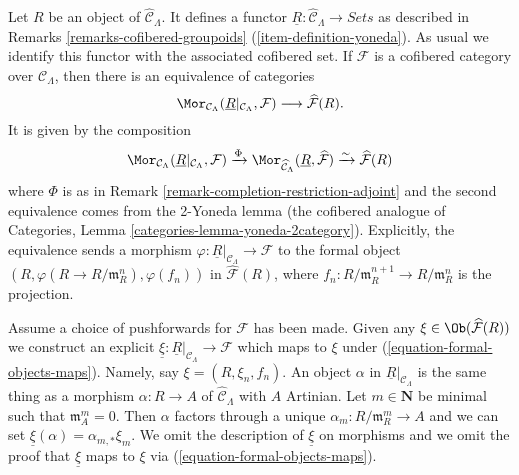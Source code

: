 \begin{remark}
\label{remark-formal-objects-yoneda}
Let $R$ be an object of $\widehat{\mathcal{C}}_\Lambda$.  It defines a functor
$\underline{R}: \widehat{\mathcal{C}}_\Lambda \to \textit{Sets}$
as described in
Remarks \ref{remarks-cofibered-groupoids} (\ref{item-definition-yoneda}).
As usual we identify this functor with the
associated cofibered set.  If $\mathcal{F}$ is a cofibered category over
$\mathcal{C}_\Lambda$, then there is an equivalence of categories
\begin{equation}
\label{equation-formal-objects-maps}
\Mor_{\mathcal{C}_\Lambda}(
\underline{R}|_{\mathcal{C}_\Lambda}, \mathcal{F})
\longrightarrow
\widehat{\mathcal{F}}(R).
\end{equation}
It is given by the composition
$$
\Mor_{\mathcal{C}_\Lambda}(
\underline{R}|_{\mathcal{C}_\Lambda}, \mathcal{F})
\xrightarrow{\Phi}
\Mor_{\widehat{\mathcal{C}}_\Lambda}(
\underline{R}, \widehat{\mathcal{F}})
\xrightarrow{\sim}
\widehat{\mathcal{F}}(R)
$$
where $\Phi$ is as in
Remark \ref{remark-completion-restriction-adjoint}
and the second equivalence comes from the 2-Yoneda lemma
(the cofibered analogue of
Categories, Lemma \ref{categories-lemma-yoneda-2category}).
Explicitly, the equivalence sends a morphism
$\varphi : \underline{R}|_{\mathcal{C}_\Lambda} \to \mathcal{F}$
to the formal object
$(R, \varphi(R \to R/\mathfrak{m}_R^n), \varphi(f_n))$ in
$\widehat{\mathcal{F}}(R)$, where
$f_n : R/\mathfrak m_R^{n + 1} \to R/\mathfrak m_R^n$ is the projection.

\medskip\noindent
Assume a choice of pushforwards for $\mathcal{F}$ has been made.
Given any $\xi \in \Ob(\widehat{\mathcal{F}}(R))$ we construct
an explicit
$\underline{\xi} : \underline{R}|_{\mathcal{C}_\Lambda} \to \mathcal{F}$
which maps to $\xi$ under (\ref{equation-formal-objects-maps}).
Namely, say $\xi = (R, \xi_n, f_n)$. An object $\alpha$ in
$\underline{R}|_{\mathcal{C}_\Lambda}$ is the same thing as a morphism
$\alpha : R \to A$ of $\widehat{\mathcal{C}}_\Lambda$ with $A$
Artinian. Let $m \in \mathbf{N}$ be minimal such that $\mathfrak m_A^m = 0$.
Then $\alpha$ factors through a unique $\alpha_m : R/\mathfrak m_R^m \to A$
and we can set $\underline{\xi}(\alpha) = \alpha_{m, *}\xi_m$.
We omit the description of $\underline{\xi}$ on morphisms and we
omit the proof that $\underline{\xi}$ maps to $\xi$
via (\ref{equation-formal-objects-maps}).


\end{remark}
